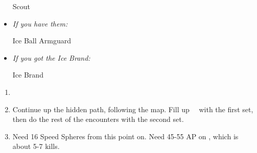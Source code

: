 \begin{equip}
	\begin{itemize}
		\wakkaf Scout
		\item \textit{If you have them:}
		      \begin{itemize}
			      \wakkaf Ice Ball
			      \wakkaf Armguard
		      \end{itemize}
		\item \textit{If you got the Ice Brand:}
		      \begin{itemize}
			      \tidusf Ice Brand
		      \end{itemize}
	\end{itemize}
\end{equip}
\begin{enumerate}[resume]
	\item \formation{\tidus}{\yuna}{\wakka}
	\item Continue up the hidden path, following the map. Fill up \valefor\ \od\ with the first set, then do the rest of the encounters with the second set.
	\item Need 16 Speed Spheres from this point on. Need 45-55 AP on \tidus, which is about 5-7 kills.
\end{enumerate}
\vfill
